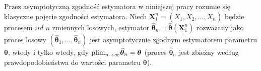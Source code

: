 \documentclass{article} %
\begin{document}
\noindent Przez asymptotyczn\k{a} zgodno\'{s}\'{c} estymatora w niniejszej pracy rozumie si\k{e} klasyczne poj\k{e}cie zgodno\'{s}ci estymatora. Niech $\underline{\mathbf{X}_{1}^{n}} =(\underline{X_{1}} ,\underline{X_{2}} ,\ldots , \underline{X_{n}} )$ b\k{e}dzie procesem $iid$ $n$ zmiennych losowych, estymator $\bm{\widehat{\theta }}_{n} = \bm{\widehat{\theta }}(\underline{\mathbf{X}_{1}^{n}} )$ rozwa\.{z}any jako proces losowy $\left(\bm{\widehat{\theta }}_{1} ,\ldots , \bm{\widehat{\theta }}_{n} \right)$  jest asymptotycznie zgodnym estymatorem parametru $\bm{\theta} $, wtedy i tylko wtedy, gdy ${\rm plim}_{n\to \infty } \bm{\widehat{\theta }}_{n} = \bm{\theta} $ (proces $\bm{\widehat{\theta }}_{n} $ jest zbie\.{z}ny wed{\l}ug prawdopodobie\'{n}stwa do warto\'{s}ci parametru $\bm{\theta} $).
\end{document}
